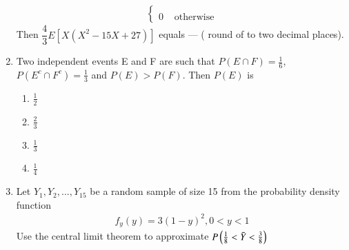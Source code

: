 \documentclass[journal,12pt,twocolumn]{IEEEtran}
\begin{document}
\begin{enumerate}
\begin{align}
\begin{cases}
\\
0 & \text{ otherwise}
\end{cases}
\end{align}
Then $\dfrac{4}{3} E [X(X^2 -15X + 27 ) ] $ equals --- ( round of to two decimal places). \\
\solution
  
%
\item Two independent events E and F are such that $P(E\cap F) = \displaystyle\frac{1}{6}$,$P(E^c\cap F^c)=\displaystyle\frac{1}{3}$ and $P(E)>P(F)$. Then $P(E)$ is
\begin{enumerate}[label=(\Alph*)]
    \item $\displaystyle\frac{1}{2}$\\
    \item $\displaystyle\frac{2}{3}$\\
    \item $\displaystyle\frac{1}{3}$\\
    \item $\displaystyle\frac{1}{4}$
\end{enumerate}
%
\solution
  
%
\item Let $Y_{1},Y_{2},...,Y_{15}$ be a random sample of size 15 from the probability density function 
\begin{align}
\tag{Eq:1}
    f_{y}(y)=3(1-y)^{2} , 0<y<1
\end{align}
Use the central limit theorem to approximate $P\left(\frac{1}{8}<\Bar{Y}<\frac{3}{8}\right)$
%
\solution
  


\end{enumerate}
\end{document}
